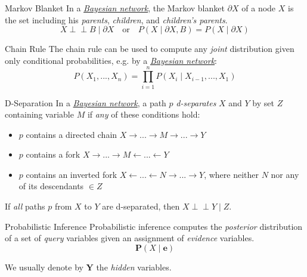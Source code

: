 \documentclass{cognito}
\begin{document}
\begin{note}{Markov Blanket}
	In a \hyperref[note:Bayesian Networks]{\emph{Bayesian network}}, the Markov blanket $\partial X$ of a node $X$ is the set including his \emph{parents}, \emph{children}, and \emph{children's parents}.
	$$
		X \perp \!\!\!\! \perp B \mid \partial X \quad \text{or} \quad P(X \mid \partial X, B) = P(X \mid \partial X)
	$$
	\vspace{-10pt}
\end{note}

\begin{note}{Chain Rule}
	The chain rule can be used to compute any \emph{joint} distribution given only conditional probabilities,
	e.g. by a \hyperref[note:Bayesian Networks]{\it Bayesian network}:
	$$
		P( X_1,..., X_n) = \prod_{i=1}^n P(X_i \mid X_{i-1}, ..., X_1)
	$$
	\vspace{-10pt}
\end{note}

\begin{note}{D-Separation}
	In a \hyperref[note:Bayesian Networks]{\it Bayesian network},
	a path $p$ \emph{d-separates} $X$ and $Y$ by set $Z$ containing variable $M$ if \emph{any} of these conditions hold:
	\begin{itemize}
		\item $p$ contains a directed chain $X \to ... \to M \to ... \to Y$
		\item $p$ contains a fork $X \to ... \to M \leftarrow ... \leftarrow Y$
		\item $p$ contains an inverted fork $X \leftarrow ... \leftarrow N \to ... \to Y$, where neither $N$ nor any of its descendants $\in Z$
	\end{itemize}
	If \emph{all} paths $p$ from $X$ to $Y$ are d-separated, then $X \perp \!\!\!\! \perp Y \mid Z$.
\end{note}


\begin{note}{Probabilistic Inference}
	Probabilistic inference computes the \emph{posterior} distribution of a set of \emph{query} variables
	given an assignment of \emph{evidence} variables.
	$$
		\mathbf{P}(X\mid \mathbf{e})
	$$
	\begin{remark} We usually denote by $\mathbf{Y}$ the \emph{hidden} variables. \end{remark}
	\vspace{-5pt}
\end{note}
\end{document}
